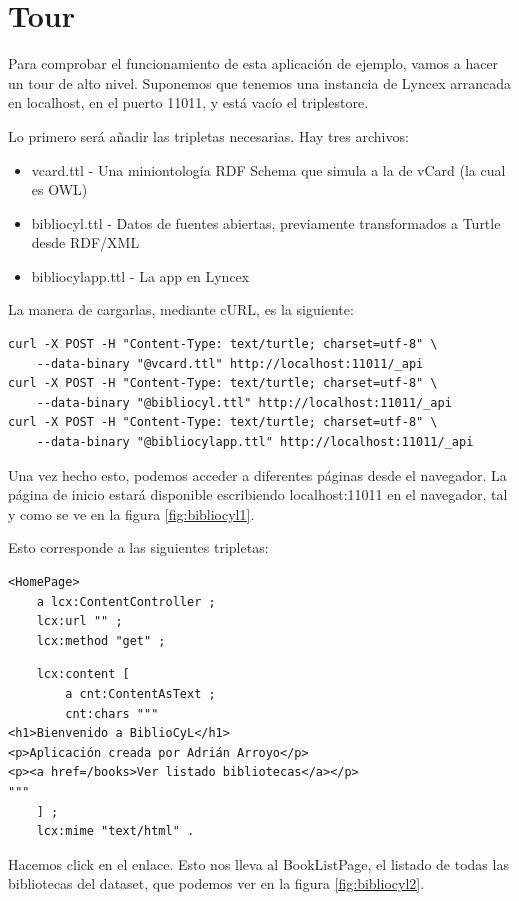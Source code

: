 \documentclass[openright,twoside,12pt]{book}
\begin{document}
\section{Tour}

Para comprobar el funcionamiento de esta aplicación de ejemplo, vamos a hacer un tour de alto nivel. Suponemos que tenemos una instancia de Lyncex arrancada en localhost, en el puerto 11011, y está vacío el triplestore.

Lo primero será añadir las tripletas necesarias. Hay tres archivos:
\begin{itemize}
    \item vcard.ttl - Una miniontología RDF Schema que simula a la de vCard (la cual es OWL)
    \item bibliocyl.ttl - Datos de fuentes abiertas, previamente transformados a Turtle desde RDF/XML
    \item bibliocylapp.ttl - La app en Lyncex
\end{itemize}

La manera de cargarlas, mediante cURL, es la siguiente:
\begin{verbatim}
curl -X POST -H "Content-Type: text/turtle; charset=utf-8" \
    --data-binary "@vcard.ttl" http://localhost:11011/_api
curl -X POST -H "Content-Type: text/turtle; charset=utf-8" \
    --data-binary "@bibliocyl.ttl" http://localhost:11011/_api
curl -X POST -H "Content-Type: text/turtle; charset=utf-8" \
    --data-binary "@bibliocylapp.ttl" http://localhost:11011/_api
\end{verbatim}

Una vez hecho esto, podemos acceder a diferentes páginas desde el navegador. La página de inicio estará disponible escribiendo localhost:11011 en el navegador, tal y como se ve en la figura \ref{fig:bibliocyl1}.

Esto corresponde a las siguientes tripletas:

\begin{lstlisting}
<HomePage>
    a lcx:ContentController ;
    lcx:url "" ;
    lcx:method "get" ;
\end{lstlisting}
\begin{lstlisting}
    lcx:content [
        a cnt:ContentAsText ;
        cnt:chars """
<h1>Bienvenido a BiblioCyL</h1>
<p>Aplicación creada por Adrián Arroyo</p>
<p><a href=/books>Ver listado bibliotecas</a></p>
"""
    ] ;
    lcx:mime "text/html" .
\end{lstlisting}

Hacemos click en el enlace. Esto nos lleva al BookListPage, el listado de todas las bibliotecas del dataset, que podemos ver en la figura \ref{fig:bibliocyl2}.
\end{document}
